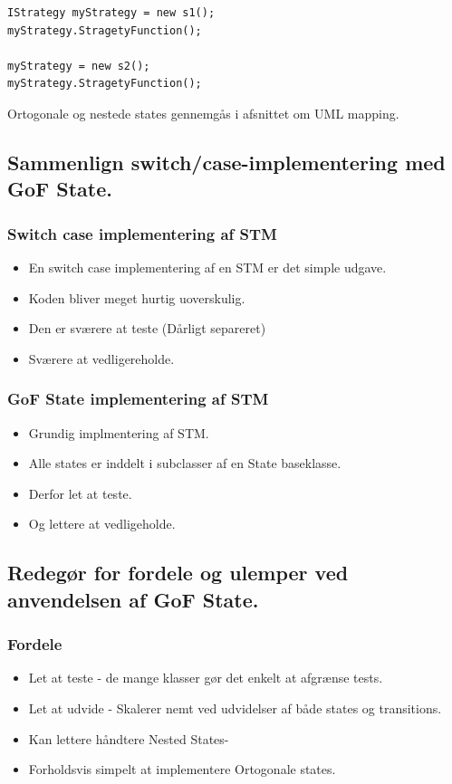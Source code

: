 \begin{lstlisting}[caption=Klients brug af strategy pattern]
IStrategy myStrategy = new s1();
myStrategy.StragetyFunction();

myStrategy = new s2();
myStrategy.StragetyFunction();
\end{lstlisting}

Ortogonale og nestede states gennemgås i afsnittet om UML mapping.

\subsection{Sammenlign switch/case-implementering med GoF State.}

\subsubsection{Switch case implementering af STM}
\begin{itemize}
	\item En switch case implementering af en STM er det simple udgave.
	\item Koden bliver meget hurtig uoverskulig.
	\item Den er sværere at teste (Dårligt separeret)
	\item Sværere at vedligereholde.
\end{itemize}

\subsubsection{GoF State implementering af STM}
\begin{itemize}
	\item Grundig implmentering af STM.
	\item Alle states er inddelt i subclasser af en State baseklasse.
	\item Derfor let at teste.
	\item Og lettere at vedligeholde.
\end{itemize}

\subsection{Redegør for fordele og ulemper ved anvendelsen af GoF State.}

\subsubsection{Fordele}
\begin{itemize}
	\item Let at teste - de mange klasser gør det enkelt at afgrænse tests.
	\item Let at udvide - Skalerer nemt ved udvidelser af både states og transitions.
	\item Kan lettere håndtere Nested States-
	\item Forholdsvis simpelt at implementere Ortogonale states.
\end{itemize}

